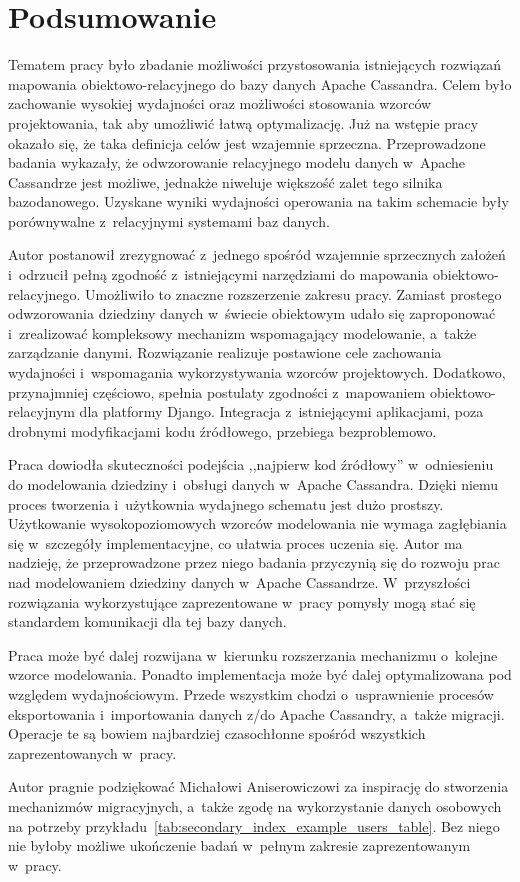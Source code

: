 
\chapter{Podsumowanie}

Tematem pracy było zbadanie możliwości przystosowania istniejących rozwiązań mapowania obiektowo-relacyjnego do bazy danych Apache Cassandra. Celem było zachowanie wysokiej wydajności oraz możliwości stosowania wzorców projektowania, tak aby umożliwić łatwą optymalizację. Już na wstępie pracy okazało się, że taka definicja celów jest wzajemnie sprzeczna. Przeprowadzone badania wykazały, że odwzorowanie relacyjnego modelu danych w~Apache Cassandrze jest możliwe, jednakże niweluje większość zalet tego silnika bazodanowego. Uzyskane wyniki wydajności operowania na takim schemacie były porównywalne z~relacyjnymi systemami baz danych.

Autor postanowił zrezygnować z~jednego spośród wzajemnie sprzecznych założeń i~odrzucił pełną zgodność z~istniejącymi narzędziami do mapowania obiektowo-relacyjnego. Umożliwiło to znaczne rozszerzenie zakresu pracy. Zamiast prostego odwzorowania dziedziny danych w~świecie obiektowym udało się zaproponować i~zrealizować kompleksowy mechanizm wspomagający modelowanie, a~także zarządzanie danymi. Rozwiązanie realizuje postawione cele zachowania wydajności i~wspomagania wykorzystywania wzorców projektowych. Dodatkowo, przynajmniej częściowo, spełnia postulaty zgodności z~mapowaniem obiektowo-relacyjnym dla platformy Django. Integracja z~istniejącymi aplikacjami, poza drobnymi modyfikacjami kodu źródłowego, przebiega bezproblemowo.

Praca dowiodła skuteczności podejścia ,,najpierw kod źródłowy'' w~odniesieniu do modelowania dziedziny i~obsługi danych w~Apache Cassandra. Dzięki niemu proces tworzenia i~użytkownia wydajnego schematu jest dużo prostszy. Użytkowanie wysokopoziomowych wzorców modelowania nie wymaga zagłębiania się w~szczegóły implementacyjne, co ułatwia proces uczenia się. Autor ma nadzieję, że przeprowadzone przez niego badania przyczynią się do rozwoju prac nad modelowaniem dziedziny danych w~Apache Cassandrze. W~przyszłości rozwiązania wykorzystujące zaprezentowane w~pracy pomysły mogą stać się standardem komunikacji dla tej bazy danych.

Praca może być dalej rozwijana w~kierunku rozszerzania mechanizmu o~kolejne wzorce modelowania. Ponadto implementacja może być dalej optymalizowana pod względem wydajnościowym. Przede wszystkim chodzi o~usprawnienie procesów eksportowania i~importowania danych z/do Apache Cassandry, a~także migracji. Operacje te są bowiem najbardziej czasochłonne spośród wszystkich zaprezentowanych w~pracy.

Autor pragnie podziękować Michałowi Aniserowiczowi za inspirację do stworzenia mechanizmów migracyjnych, a~także zgodę na wykorzystanie danych osobowych na potrzeby przykładu~\ref{tab:secondary_index_example_users_table}. Bez niego nie byłoby możliwe ukończenie badań w~pełnym zakresie zaprezentowanym w~pracy.
